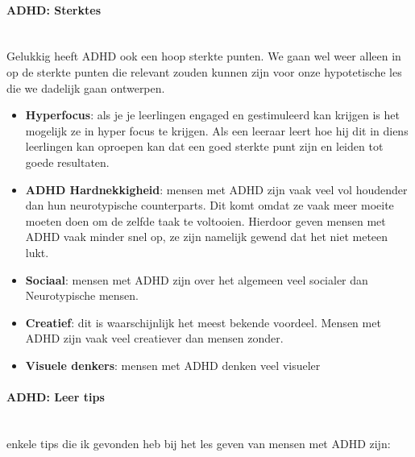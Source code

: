 \documentclass{article}
\begin{document}
                \bigskip
                \noindent\paragraph{ADHD: Sterktes}\\
                    Gelukkig heeft ADHD ook een hoop sterkte punten. We gaan wel weer alleen in op de sterkte punten die relevant zouden kunnen zijn voor onze hypotetische les die we dadelijk gaan ontwerpen.
                    \begin{itemize}
                        \item \textbf{Hyperfocus}:
                            als je je leerlingen engaged en gestimuleerd kan krijgen is het mogelijk ze in hyper focus te krijgen. Als een leeraar leert hoe hij dit in diens leerlingen kan oproepen kan dat een goed sterkte punt zijn en leiden tot goede resultaten.

                        \item \textbf{ADHD Hardnekkigheid}:
                            mensen met ADHD zijn vaak veel vol houdender dan hun neurotypische counterparts. Dit komt omdat ze vaak meer moeite moeten doen om de zelfde taak te voltooien. Hierdoor geven mensen met ADHD vaak minder snel op, ze zijn namelijk gewend dat het niet meteen lukt.\cite{ADHD-resilience}
                        \item \textbf{Sociaal}: 
                            mensen met ADHD zijn over het algemeen veel socialer dan Neurotypische mensen. 
                        \item \textbf{Creatief}: 
                            dit is waarschijnlijk het meest bekende voordeel. Mensen met ADHD zijn vaak veel creatiever dan mensen zonder.\cite{ADHD-creativity}
                        \item \textbf{Visuele denkers}: 
                        mensen met ADHD denken veel visueler
                    \end{itemize}
                \bigskip
                \noindent\paragraph{ADHD: Leer tips}\\
                enkele tips die ik gevonden heb bij het les geven van mensen met ADHD zijn:
\end{document}
